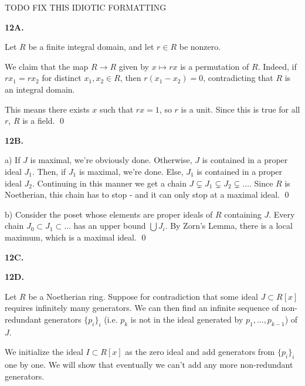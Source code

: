 TODO FIX THIS IDIOTIC FORMATTING

\textbf{12A.} 

Let $R$ be a finite integral domain, and let $r\in R$ be nonzero.  

We claim that the map $R\rightarrow R$ given by $x\mapsto rx$ is a permutation of $R$.  Indeed, if $rx_1=rx_2$ for distinct $x_1,x_2\in R$, then $r(x_1-x_2)=0$, contradicting that $R$ is an integral domain.  

This means there exists $x$ such that $rx=1$, so $r$ is a unit.  Since this is true for all $r$, $R$ is a field.  \qed

\textbf{12B.} 

a) If $J$ is maximal, we're obviously done.  Otherwise, $J$ is contained in a proper ideal $J_1$.  Then, if $J_1$ is maximal, we're done.  Else, $J_1$ is contained in a proper ideal $J_2$.  Continuing in this manner we get a chain $J\subsetneq J_1\subsetneq J_2\subsetneq\dots$.  Since $R$ is Noetherian, this chain has to stop - and it can only stop at a maximal ideal.  \qed

b) Consider the poset whose elements are proper ideals of $R$ containing $J$.  Every chain $J_0\subset J_1\subset \dots$ has an upper bound $\bigcup J_i$.  By Zorn's Lemma, there is a local maximum, which is a maximal ideal.  \qed

\textbf{12C.}

\textbf{12D.}

Let $R$ be a Noetherian ring.  Suppose for contradiction that some ideal $J\subset R[x]$ requires infinitely many generators.  We can then find an infinite sequence of non-redundant generators $\{p_i\}_i$ (i.e. $p_k$ is not in the ideal generated by $p_1,\dots,p_{k-1}$) of $J$.  

We initialize the ideal $I\subset R[x]$ as the zero ideal and add generators from $\{p_i\}_i$ one by one.  We will show that eventually we can't add any more non-redundant generators.  

